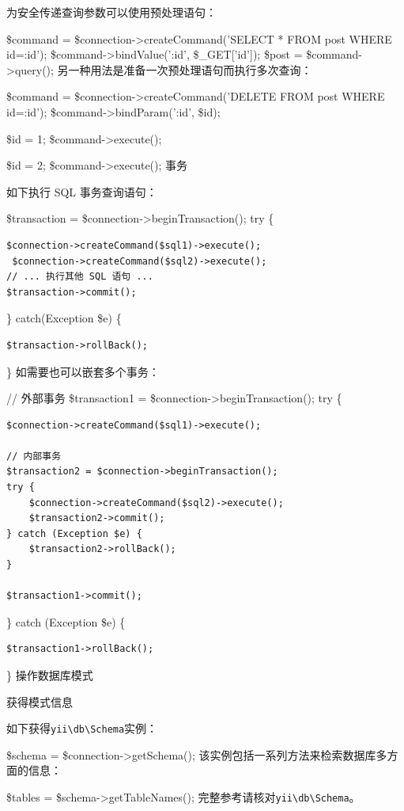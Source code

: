 为安全传递查询参数可以使用预处理语句：

\$command = \$connection->createCommand('SELECT * FROM post WHERE id=:id');
\$command->bindValue(':id', \$\_GET['id']);
\$post = \$command->query();
另一种用法是准备一次预处理语句而执行多次查询：

\$command = \$connection->createCommand('DELETE FROM post WHERE id=:id');
\$command->bindParam(':id', \$id);

\$id = 1;
\$command->execute();

\$id = 2;
\$command->execute();
事务

如下执行 SQL 事务查询语句：

\$transaction = \$connection->beginTransaction();
try \{

\begin{lstlisting}
$connection->createCommand($sql1)->execute();
 $connection->createCommand($sql2)->execute();
// ... 执行其他 SQL 语句 ...
$transaction->commit();
\end{lstlisting}
\} catch(Exception \$e) \{

\begin{lstlisting}
$transaction->rollBack();
\end{lstlisting}
\}
如需要也可以嵌套多个事务：

// 外部事务
\$transaction1 = \$connection->beginTransaction();
try \{

\begin{lstlisting}
$connection->createCommand($sql1)->execute();

// 内部事务
$transaction2 = $connection->beginTransaction();
try {
    $connection->createCommand($sql2)->execute();
    $transaction2->commit();
} catch (Exception $e) {
    $transaction2->rollBack();
}

$transaction1->commit();
\end{lstlisting}
\} catch (Exception \$e) \{

\begin{lstlisting}
$transaction1->rollBack();
\end{lstlisting}
\}
操作数据库模式

获得模式信息

如下获得\texttt{yii{\allowbreak{}\textbackslash}db{\allowbreak{}\textbackslash}Schema}实例：

\$schema = \$connection->getSchema();
该实例包括一系列方法来检索数据库多方面的信息：

\$tables = \$schema->getTableNames();
完整参考请核对\texttt{yii{\allowbreak{}\textbackslash}db{\allowbreak{}\textbackslash}Schema}。

